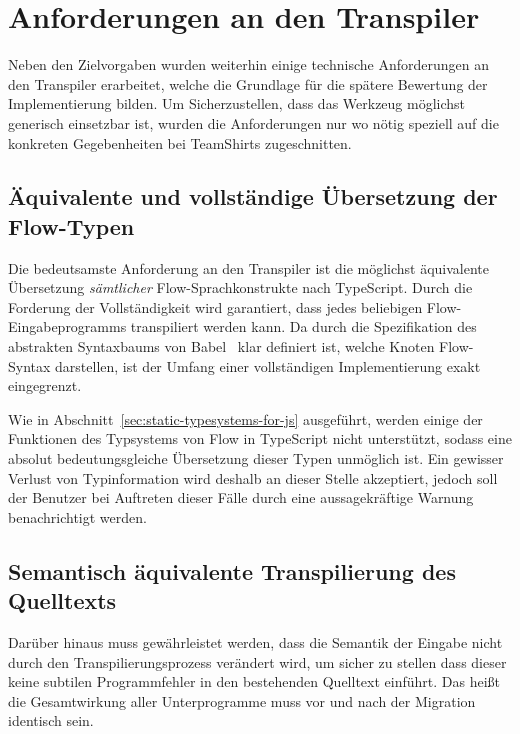 \section{Anforderungen an den Transpiler}

Neben den Zielvorgaben wurden weiterhin einige technische Anforderungen an den Transpiler erarbeitet, welche die Grundlage für die spätere Bewertung der Implementierung bilden. Um Sicherzustellen, dass das Werkzeug möglichst generisch einsetzbar ist, wurden die Anforderungen nur wo nötig speziell auf die konkreten Gegebenheiten bei TeamShirts zugeschnitten.

\subsection{Äquivalente und vollständige Übersetzung der Flow-Typen}
\label{subsec:requirement:correct-translation}

Die bedeutsamste Anforderung an den Transpiler ist die möglichst äquivalente Übersetzung \emph{sämtlicher} Flow-Sprachkonstrukte nach TypeScript. Durch die Forderung der Vollständigkeit wird garantiert, dass jedes beliebigen Flow-Eingabeprogramms transpiliert werden kann. Da durch die Spezifikation des abstrakten Syntaxbaums von Babel~\autocite{BABEL:PARSER_SPEC} klar definiert ist, welche Knoten Flow-Syntax darstellen, ist der Umfang einer vollständigen Implementierung exakt eingegrenzt.

Wie in Abschnitt~\ref{sec:static-typesystems-for-js} ausgeführt, werden einige der Funktionen des Typsystems von Flow in TypeScript nicht unterstützt, sodass eine absolut bedeutungsgleiche Übersetzung dieser Typen unmöglich ist. Ein gewisser Verlust von Typinformation wird deshalb an dieser Stelle akzeptiert, jedoch soll der Benutzer bei Auftreten dieser Fälle durch eine aussagekräftige Warnung benachrichtigt werden.

\subsection{Semantisch äquivalente Transpilierung des Quelltexts}
\label{subsec:requirement:semantic-equivalence}

Darüber hinaus muss gewährleistet werden, dass die Semantik der Eingabe nicht durch den Transpilierungsprozess verändert wird, um sicher zu stellen dass dieser keine subtilen Programmfehler in den bestehenden Quelltext einführt. Das heißt die Gesamtwirkung aller Unterprogramme muss vor und nach der Migration identisch sein.

